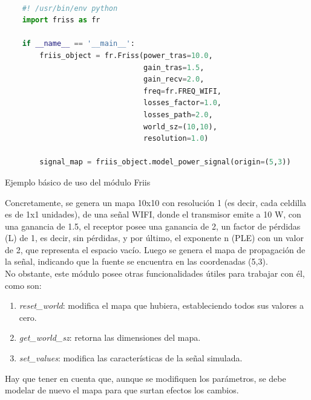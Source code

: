 \begin{code}[H]
    \begin{lstlisting}[language=Python]

    #! /usr/bin/env python
    import friss as fr

    if __name__ == '__main__':
        friis_object = fr.Friss(power_tras=10.0,
                                gain_tras=1.5,
                                gain_recv=2.0,
                                freq=fr.FREQ_WIFI,
                                losses_factor=1.0,
                                losses_path=2.0,
                                world_sz=(10,10),
                                resolution=1.0)

        signal_map = friis_object.model_power_signal(origin=(5,3))

\end{lstlisting}
\caption[Ejemplo básico de uso del módulo Friis]{Ejemplo básico de uso del módulo Friis}
\label{cod:friis_basics}
\end{code}

Concretamente, se genera un mapa 10x10 con resolución 1 (es decir, cada celdilla es de 1x1 unidades), de una señal WIFI, donde el transmisor emite a 10 W, con una ganancia de 1.5, el receptor posee una ganancia de 2, un factor de pérdidas (L) de 1, es decir, sin pérdidas, y por último, el exponente n (\ac{PLE}) con un valor de 2, que representa el espacio vacío. Luego se genera el mapa de propagación de la señal, indicando que la fuente se encuentra en las coordenadas (5,3).\\

No obstante, este módulo posee otras funcionalidades útiles para trabajar con él, como son:

\begin{enumerate}
    \item \emph{reset\_world}: modifica el mapa que hubiera, estableciendo todos sus valores a cero.

    \item \emph{get\_world\_sz}: retorna las dimensiones del mapa.

    \item \emph{set\_values}: modifica las características de la señal simulada.
\end{enumerate}

Hay que tener en cuenta que, aunque se modifiquen los parámetros, se debe modelar de nuevo el mapa para que surtan efectos los cambios.\\

